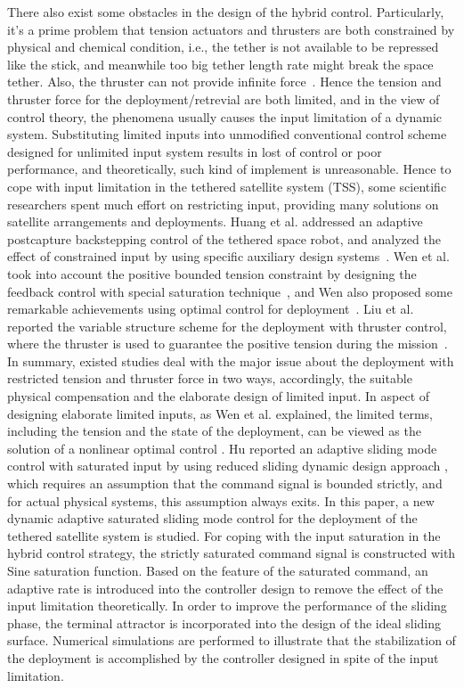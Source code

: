 \documentclass[Journal,letterpaper]{ascelike-new}
\theoremstyle{plain}
\theoremstyle{remark}
\begin{document}
There also exist some obstacles in the design of the hybrid control. Particularly, it's a prime problem that tension actuators and thrusters are both constrained by physical and chemical condition, i.e., the tether is not available to be repressed like the stick, and meanwhile too big tether length rate might break the space tether. Also, the thruster can not provide infinite force~\cite{martinez1998spacecraft}. Hence the tension and thruster force for the deployment/retrevial are both limited, and in the view of control theory, the phenomena usually causes the input limitation of a dynamic system. Substituting limited inputs into unmodified conventional control scheme designed for unlimited input system results in lost of control or poor performance, and theoretically, such kind of implement is unreasonable. Hence to cope with input limitation in the tethered satellite system (TSS), some scientific researchers spent much effort on restricting input, providing many solutions on satellite arrangements and deployments. Huang et al. addressed an adaptive postcapture backstepping control of the tethered space robot, and analyzed the effect of constrained input by using specific auxiliary design systems~\cite{huang2015adaptive}. Wen et al. took into account the positive bounded tension constraint by designing the feedback control with special saturation technique~\cite{wen2016constrained}, and Wen also proposed some remarkable achievements using optimal control for deployment~\cite{wen2008optimal}. Liu et al. reported the variable structure scheme for the deployment with thruster control, where the thruster is used to guarantee the positive tension during the mission~\cite{yingying2012variable}. In summary, existed studies deal with the major issue about the deployment with restricted tension and thruster force in two ways, accordingly, the suitable physical compensation and the elaborate design of limited input. In aspect of designing elaborate limited inputs, as Wen et al. explained, the limited terms, including the tension and the state of the deployment, can be viewed as the solution of a nonlinear optimal control \cite{wen2015tension}. Hu reported an adaptive sliding mode control with saturated input by using reduced sliding dynamic design approach \cite{Hu2009Robust}, which requires an assumption that the command signal is bounded strictly, and for actual physical systems, this assumption always exits. In this paper, a new dynamic adaptive saturated sliding mode  control for the deployment of the tethered satellite system is studied. For coping with the input saturation in the hybrid control strategy, the strictly saturated command signal is constructed with Sine saturation function. Based on the feature of the saturated command, an adaptive rate is introduced into the controller design to remove the effect of the input limitation theoretically. In order to improve the performance of the sliding phase, the terminal attractor is incorporated into the design of the ideal sliding surface. Numerical simulations are performed to illustrate that the stabilization of the deployment is accomplished by the controller designed in spite of the input limitation.\par
\end{document}
